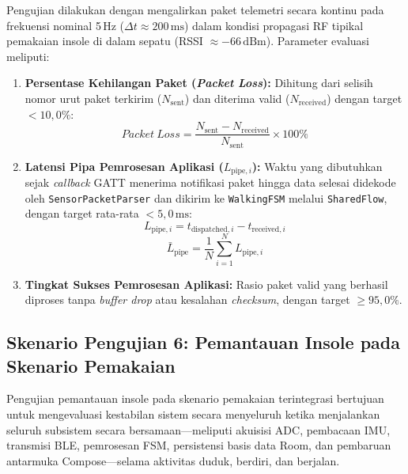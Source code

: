 Pengujian dilakukan dengan mengalirkan paket telemetri secara kontinu pada frekuensi nominal 5\,Hz ($\Delta t \approx 200\,\mathrm{ms}$) dalam kondisi propagasi RF tipikal pemakaian insole di dalam sepatu (RSSI $\approx -66\,\mathrm{dBm}$). Parameter evaluasi meliputi:
\begin{enumerate}
    \item \textbf{Persentase Kehilangan Paket (\textit{Packet Loss}):} Dihitung dari selisih nomor urut paket terkirim ($N_{\mathrm{sent}}$) dan diterima valid ($N_{\mathrm{received}}$) dengan target $< 10{,}0\%$:
    \begin{equation}
    Packet\ Loss = \frac{N_{\mathrm{sent}}-N_{\mathrm{received}}}{N_{\mathrm{sent}}} \times 100\%
    \end{equation}
    \item \textbf{Latensi Pipa Pemrosesan Aplikasi ($L_{\mathrm{pipe},i}$):} Waktu yang dibutuhkan sejak \textit{callback} GATT menerima notifikasi paket hingga data selesai didekode oleh \texttt{SensorPacketParser} dan dikirim ke \texttt{WalkingFSM} melalui \texttt{SharedFlow}, dengan target rata-rata $< 5{,}0\,\mathrm{ms}$:
    \begin{equation}
    L_{\mathrm{pipe},i} = t_{\mathrm{dispatched},i} - t_{\mathrm{received},i}
    \end{equation}
    \begin{equation}
    \bar{L}_{\mathrm{pipe}} = \frac{1}{N}\sum_{i=1}^{N} L_{\mathrm{pipe},i}
    \end{equation}
    \item \textbf{Tingkat Sukses Pemrosesan Aplikasi:} Rasio paket valid yang berhasil diproses tanpa \textit{buffer drop} atau kesalahan \textit{checksum}, dengan target $\ge 95{,}0\%$.
\end{enumerate}

\subsection{Skenario Pengujian 6: Pemantauan Insole pada Skenario Pemakaian}
\label{subsec:Skenario6}

Pengujian pemantauan insole pada skenario pemakaian terintegrasi bertujuan untuk mengevaluasi kestabilan sistem secara menyeluruh ketika menjalankan seluruh subsistem secara bersamaan—meliputi akuisisi ADC, pembacaan IMU, transmisi BLE, pemrosesan FSM, persistensi basis data Room, dan pembaruan antarmuka Compose—selama aktivitas duduk, berdiri, dan berjalan.


